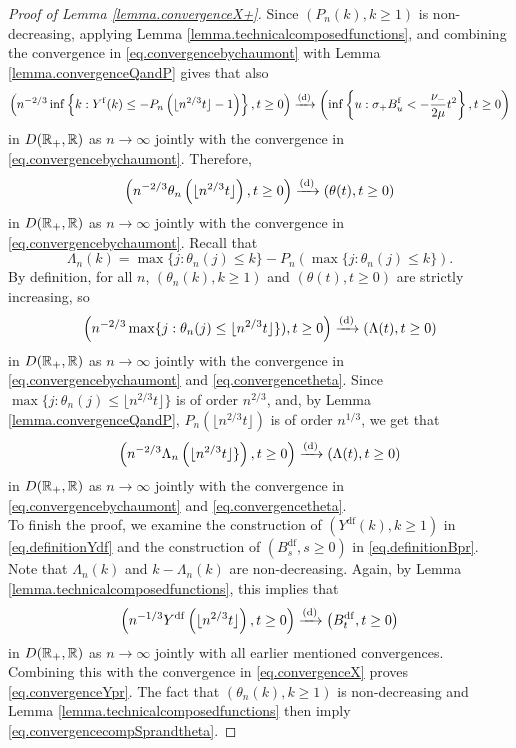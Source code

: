\begin{proof}[Proof of Lemma \ref{lemma.convergenceX+}]
Since $(P_n(k),k\geq 1)$ is non-decreasing, applying Lemma \ref{lemma.technicalcomposedfunctions}, and combining the convergence in \cref{eq.convergencebychaumont} with Lemma \ref{lemma.convergenceQandP} gives that also
$$\left(n^{-2/3}\inf\left\{k:Y^{\mathrm{f}}(k) \leq - P_n\left(\lfloor n^{2/3} t \rfloor -1\right)\right\},t\geq 0\right)\xrightarrow[]{\mathrm{(d)}}\left(\inf\left\{u:\sigma_+ B^{\mathrm{f}}_u< -\frac{\nu_-}{2\mu} t^2\right\},t\geq 0\right)$$
  in $D({\mathbb R}_+,{\mathbb R})$ as $n\to \infty$ jointly with the convergence in \cref{eq.convergencebychaumont}. Therefore, 
 \begin{equation}\label{eq.convergencetheta}\left(n^{-2/3}\theta_n\left(\lfloor n^{2/3}t\rfloor \right),t\geq 0 \right) \xrightarrow[]{\mathrm{(d)}} \left(\theta(t),t\geq 0\right)\end{equation}
  in $D({\mathbb R}_+,{\mathbb R})$ as $n\to \infty$ jointly with the convergence in \cref{eq.convergencebychaumont}.
Recall that 
$$\Lambda_n(k)=\max\{j:\theta_n(j)\leq k\}-P_n(\max\{j:\theta_n(j)\leq k\}). $$ By definition, for all $n$, $(\theta_n(k),k\geq 1)$ and $(\theta(t),t\geq 0)$ are strictly increasing, so
$$\left(n^{-2/3}\max\{j:\theta_n(j)\leq \lfloor n^{2/3} t \rfloor\} ),t\geq 0\right)\xrightarrow[]{\mathrm{(d)}}\left( \Lambda(t),t\geq0 \right)$$
in $D({\mathbb R}_+,{\mathbb R})$ as $n\to \infty$ jointly with the convergence in \cref{eq.convergencebychaumont} and \cref{eq.convergencetheta}. Since $\max\{j:\theta_n(j)\leq \lfloor n^{2/3} t \rfloor\}$ is of order $n^{2/3}$, and, by Lemma \ref{lemma.convergenceQandP}, $P_n(\lfloor n^{2/3}t\rfloor)$ is of order $n^{1/3}$, we get that 
$$\left(n^{-2/3}\Lambda_n\left(\lfloor n^{2/3} t \rfloor\} \right),t\geq 0\right)\xrightarrow[]{\mathrm{(d)}}\left( \Lambda(t),t\geq0 \right)$$
in $D({\mathbb R}_+,{\mathbb R})$ as $n\to \infty$ jointly with the convergence in \cref{eq.convergencebychaumont} and \cref{eq.convergencetheta}.\\
To finish the proof, we examine the construction of $(Y^{\mathrm{df}}(k),k\geq 1)$ in \cref{eq.definitionYdf} and the construction of $(B^{\mathrm{df}}_s,s\geq 0)$ in \cref{eq.definitionBpr}. 
Note that $\Lambda_n(k)$ and $k-\Lambda_n(k)$ are non-decreasing. Again, by Lemma \ref{lemma.technicalcomposedfunctions}, this implies that 
$$\left(n^{-1/3}Y^{\mathrm{df}}\left( \lfloor n^{2/3} t \rfloor \right), t\geq 0 \right)\xrightarrow[]{\mathrm{(d)}} \left( B^{\mathrm{df}}_{t}, t\geq 0\right)$$
in $D({\mathbb R}_+,{\mathbb R})$ as $n\to \infty$ jointly with all earlier mentioned convergences. Combining this with the convergence in \cref{eq.convergenceX} proves \cref{eq.convergenceYpr}. The fact that $(\theta_n(k),k\geq 1)$ is non-decreasing and Lemma \ref{lemma.technicalcomposedfunctions} then imply \cref{eq.convergencecompSprandtheta}. 
\end{proof}

